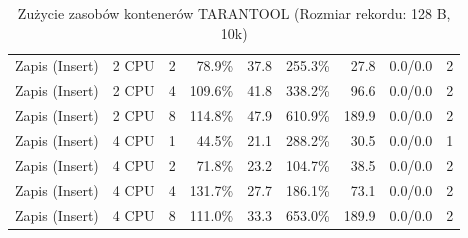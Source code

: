 \begin{table}[ht]
{\begin{tabular}{llcrrrrcc}
Zapis (Insert) & 2 CPU & 2 & 78.9\% & 37.8 & 255.3\% & 27.8 & 0.0/0.0 & 2 \\
Zapis (Insert) & 2 CPU & 4 & 109.6\% & 41.8 & 338.2\% & 96.6 & 0.0/0.0 & 2 \\
Zapis (Insert) & 2 CPU & 8 & 114.8\% & 47.9 & 610.9\% & 189.9 & 0.0/0.0 & 2 \\
Zapis (Insert) & 4 CPU & 1 & 44.5\% & 21.1 & 288.2\% & 30.5 & 0.0/0.0 & 1 \\
Zapis (Insert) & 4 CPU & 2 & 71.8\% & 23.2 & 104.7\% & 38.5 & 0.0/0.0 & 2 \\
Zapis (Insert) & 4 CPU & 4 & 131.7\% & 27.7 & 186.1\% & 73.1 & 0.0/0.0 & 2 \\
Zapis (Insert) & 4 CPU & 8 & 111.0\% & 33.3 & 653.0\% & 189.9 & 0.0/0.0 & 2 \\
\bottomrule
\end{tabular}%
}
\caption{Zużycie zasobów kontenerów TARANTOOL (Rozmiar rekordu: 128 B, 10k)}
\label{tab:resources_tarantool_small_10000}
\end{table}
